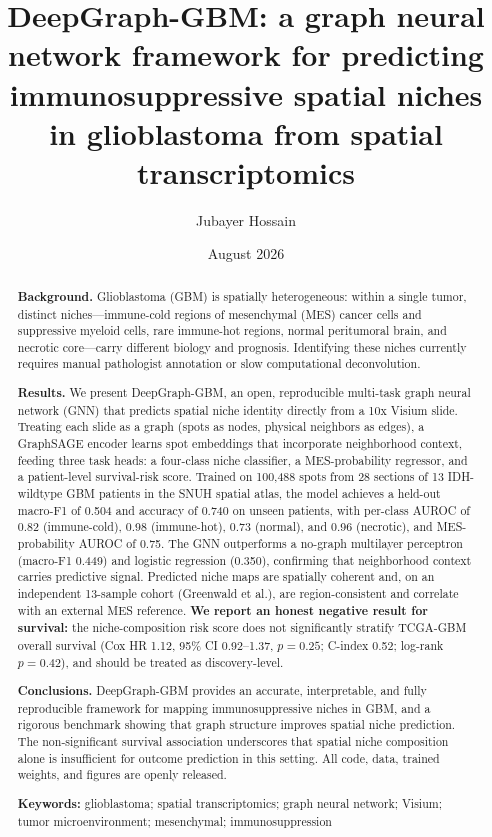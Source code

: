 \documentclass[11pt,letterpaper]{article}
\title{\bfseries DeepGraph-GBM: a graph neural network framework for predicting immunosuppressive spatial niches in glioblastoma from spatial transcriptomics}
\author[1,*]{Jubayer Hossain}
\affil[1]{Independent Researcher}
\affil[*]{Correspondence: jubayer@example.org}
\date{August 2026}
\begin{document}
\maketitle
\thispagestyle{fancy}

\begin{abstract}
\noindent\textbf{Background.} Glioblastoma (GBM) is spatially heterogeneous: within a single tumor, distinct niches---immune-cold regions of mesenchymal (MES) cancer cells and suppressive myeloid cells, rare immune-hot regions, normal peritumoral brain, and necrotic core---carry different biology and prognosis. Identifying these niches currently requires manual pathologist annotation or slow computational deconvolution.

\noindent\textbf{Results.} We present DeepGraph-GBM, an open, reproducible multi-task graph neural network (GNN) that predicts spatial niche identity directly from a 10x Visium slide. Treating each slide as a graph (spots as nodes, physical neighbors as edges), a GraphSAGE encoder learns spot embeddings that incorporate neighborhood context, feeding three task heads: a four-class niche classifier, a MES-probability regressor, and a patient-level survival-risk score. Trained on 100{,}488 spots from 28 sections of 13 IDH-wildtype GBM patients in the SNUH spatial atlas, the model achieves a held-out macro-F1 of 0.504 and accuracy of 0.740 on unseen patients, with per-class AUROC of 0.82 (immune-cold), 0.98 (immune-hot), 0.73 (normal), and 0.96 (necrotic), and MES-probability AUROC of 0.75. The GNN outperforms a no-graph multilayer perceptron (macro-F1 0.449) and logistic regression (0.350), confirming that neighborhood context carries predictive signal. Predicted niche maps are spatially coherent and, on an independent 13-sample cohort (Greenwald et al.), are region-consistent and correlate with an external MES reference. \textbf{We report an honest negative result for survival:} the niche-composition risk score does not significantly stratify TCGA-GBM overall survival (Cox HR 1.12, 95\% CI 0.92--1.37, $p=0.25$; C-index 0.52; log-rank $p=0.42$), and should be treated as discovery-level.

\noindent\textbf{Conclusions.} DeepGraph-GBM provides an accurate, interpretable, and fully reproducible framework for mapping immunosuppressive niches in GBM, and a rigorous benchmark showing that graph structure improves spatial niche prediction. The non-significant survival association underscores that spatial niche composition alone is insufficient for outcome prediction in this setting. All code, data, trained weights, and figures are openly released.

\noindent\textbf{Keywords:} glioblastoma; spatial transcriptomics; graph neural network; Visium; tumor microenvironment; mesenchymal; immunosuppression
\end{abstract}
\end{document}
